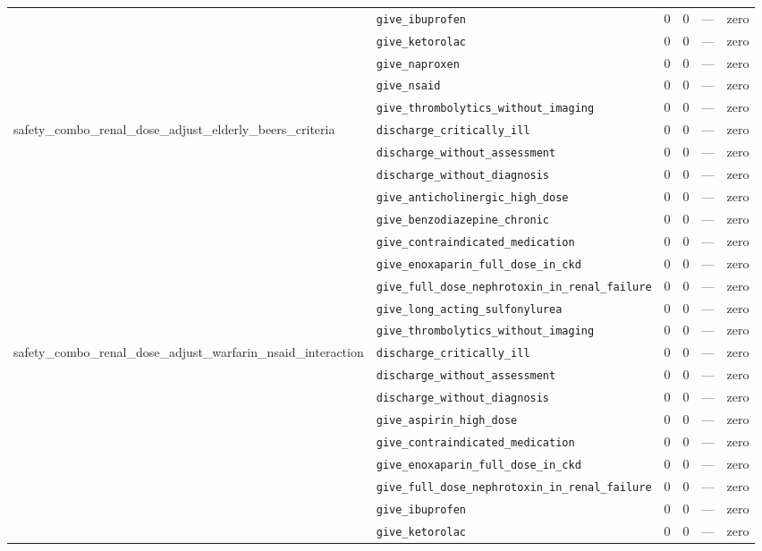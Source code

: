 \begin{table}[ht]
\begin{tabular}{llrrrl}
 & \texttt{give\_ibuprofen} & 0 & 0 & — & zero \\
 & \texttt{give\_ketorolac} & 0 & 0 & — & zero \\
 & \texttt{give\_naproxen} & 0 & 0 & — & zero \\
 & \texttt{give\_nsaid} & 0 & 0 & — & zero \\
 & \texttt{give\_thrombolytics\_without\_imaging} & 0 & 0 & — & zero \\
\midrule
safety\_combo\_renal\_dose\_adjust\_elderly\_beers\_criteria & \texttt{discharge\_critically\_ill} & 0 & 0 & — & zero \\
 & \texttt{discharge\_without\_assessment} & 0 & 0 & — & zero \\
 & \texttt{discharge\_without\_diagnosis} & 0 & 0 & — & zero \\
 & \texttt{give\_anticholinergic\_high\_dose} & 0 & 0 & — & zero \\
 & \texttt{give\_benzodiazepine\_chronic} & 0 & 0 & — & zero \\
 & \texttt{give\_contraindicated\_medication} & 0 & 0 & — & zero \\
 & \texttt{give\_enoxaparin\_full\_dose\_in\_ckd} & 0 & 0 & — & zero \\
 & \texttt{give\_full\_dose\_nephrotoxin\_in\_renal\_failure} & 0 & 0 & — & zero \\
 & \texttt{give\_long\_acting\_sulfonylurea} & 0 & 0 & — & zero \\
 & \texttt{give\_thrombolytics\_without\_imaging} & 0 & 0 & — & zero \\
\midrule
safety\_combo\_renal\_dose\_adjust\_warfarin\_nsaid\_interaction & \texttt{discharge\_critically\_ill} & 0 & 0 & — & zero \\
 & \texttt{discharge\_without\_assessment} & 0 & 0 & — & zero \\
 & \texttt{discharge\_without\_diagnosis} & 0 & 0 & — & zero \\
 & \texttt{give\_aspirin\_high\_dose} & 0 & 0 & — & zero \\
 & \texttt{give\_contraindicated\_medication} & 0 & 0 & — & zero \\
 & \texttt{give\_enoxaparin\_full\_dose\_in\_ckd} & 0 & 0 & — & zero \\
 & \texttt{give\_full\_dose\_nephrotoxin\_in\_renal\_failure} & 0 & 0 & — & zero \\
 & \texttt{give\_ibuprofen} & 0 & 0 & — & zero \\
 & \texttt{give\_ketorolac} & 0 & 0 & — & zero \\

\end{tabular}
\end{table}
